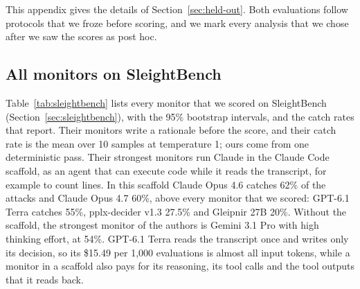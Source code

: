 This appendix gives the details of Section~\ref{sec:held-out}.
Both evaluations follow protocols that we froze before scoring, and we mark every analysis that we chose after we saw the scores as post hoc.

\subsection{All monitors on SleightBench}
\label{app:sleightbench}

Table~\ref{tab:sleightbench} lists every monitor that we scored on SleightBench (Section~\ref{sec:sleightbench}), with the 95\% bootstrap intervals, and the catch rates that \citet{najt2026sleight} report.
Their monitors write a rationale before the score, and their catch rate is the mean over 10 samples at temperature 1; ours come from one deterministic pass.
Their strongest monitors run Claude in the Claude Code scaffold, as an agent that can execute code while it reads the transcript, for example to count lines.
In this scaffold Claude Opus 4.6 catches 62\% of the attacks and Claude Opus 4.7 60\%, above every monitor that we scored: GPT-6.1 Terra catches 55\%, pplx-decider v1.3 27.5\% and Gleipnir 27B 20\%.
Without the scaffold, the strongest monitor of the authors is Gemini 3.1 Pro with high thinking effort, at 54\%.
GPT-6.1 Terra reads the transcript once and writes only its decision, so its \$15.49 per 1,000 evaluations is almost all input tokens, while a monitor in a scaffold also pays for its reasoning, its tool calls and the tool outputs that it reads back.

